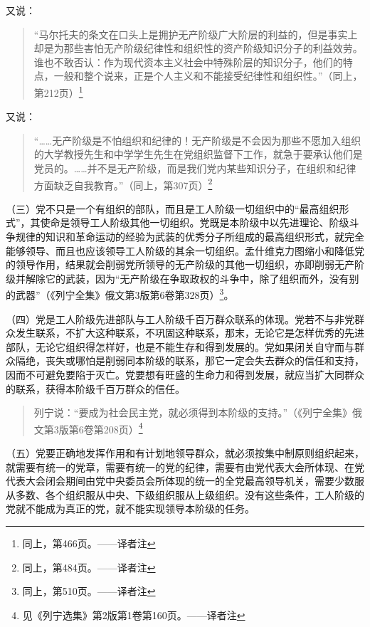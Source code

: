 又说：

\begin{quotation}
“马尔托夫的条文在口头上是拥护无产阶级广大阶层的利益的，但是事实上却是为那些害怕无产阶级纪律性和组织性的资产阶级知识分子的利益效劳。谁也不敢否认：作为现代资本主义社会中特殊阶层的知识分子，他们的特点，一般和整个说来，正是个人主义和不能接受纪律性和组织性。”（同上，第212页）\footnote{同上，第466页。——译者注}
\end{quotation}

又说：

\begin{quotation}
“……无产阶级是不怕组织和纪律的！无产阶级是不会因为那些不愿加入组织的大学教授先生和中学学生先生在党组织监督下工作，就急于要承认他们是党员的。……并不是无产阶级，而是我们党内某些知识分子，在组织和纪律方面缺乏自我教育。”（同上，第307页）\footnote{同上，第484页。——译者注}
\end{quotation}

（三）党不只是一个有组织的部队，而且是工人阶级一切组织中的“最高组织形式”，其使命是领导工人阶级其他一切组织。党既是本阶级中以先进理论、阶级斗争规律的知识和革命运动的经验为武装的优秀分子所组成的最高组织形式，就完全能够领导、而且也应该领导工人阶级的其余一切组织。孟什维克力图缩小和降低党的领导作用，结果就会削弱党所领导的无产阶级的其他一切组织，亦即削弱无产阶级并解除它的武装，因为“无产阶级在争取政权的斗争中，除了组织而外，没有别的武器”（《列宁全集》俄文第3版第6卷第328页）\footnote{同上，第510页。——译者注}。

（四）党是工人阶级先进部队与工人阶级千百万群众联系的体现。党若不与非党群众发生联系，不扩大这种联系，不巩固这种联系，那末，无论它是怎样优秀的先进部队，无论它组织得怎样好，也是不能生存和得到发展的。党如果闭关自守而与群众隔绝，丧失或哪怕是削弱同本阶级的联系，那它一定会失去群众的信任和支持，因而不可避免要陷于灭亡。党要想有旺盛的生命力和得到发展，就应当扩大同群众的联系，获得本阶级千百万群众的信任。

\begin{quotation}
列宁说：“要成为社会民主党，就必须得到本阶级的支持。”（《列宁全集》俄文第3版第6卷第208页）\footnote{见《列宁选集》第2版第1卷第160页。——译者注}
\end{quotation}

（五）党要正确地发挥作用和有计划地领导群众，就必须按集中制原则组织起来，就需要有统一的党章，需要有统一的党的纪律，需要有由党代表大会所体现、在党代表大会闭会期间由党中央委员会所体现的统一的全党最高领导机关，需要少数服从多数、各个组织服从中央、下级组织服从上级组织。没有这些条件，工人阶级的党就不能成为真正的党，就不能实现领导本阶级的任务。

